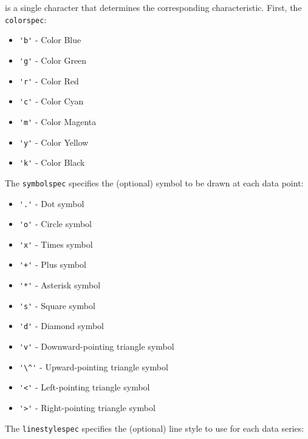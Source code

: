 is a single character that determines the corresponding characteristic.  First, the 
\verb|colorspec|:
\begin{itemize}
\item  \verb|'b'| - Color Blue

\item  \verb|'g'| - Color Green

\item  \verb|'r'| - Color Red

\item  \verb|'c'| - Color Cyan

\item  \verb|'m'| - Color Magenta

\item  \verb|'y'| - Color Yellow

\item  \verb|'k'| - Color Black

\end{itemize}
The \verb|symbolspec| specifies the (optional) symbol to be drawn at each data point:
\begin{itemize}
\item  \verb|'.'| - Dot symbol

\item  \verb|'o'| - Circle symbol

\item  \verb|'x'| - Times symbol

\item  \verb|'+'| - Plus symbol

\item  \verb|'*'| - Asterisk symbol

\item  \verb|'s'| - Square symbol

\item  \verb|'d'| - Diamond symbol

\item  \verb|'v'| - Downward-pointing triangle symbol

\item  \verb|'\^'| - Upward-pointing triangle symbol

\item  \verb|'<'| - Left-pointing triangle symbol

\item  \verb|'>'| - Right-pointing triangle symbol

\end{itemize}
The \verb|linestylespec| specifies the (optional) line style to use for each data series:
